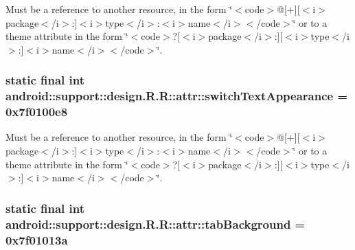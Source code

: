 Must be a reference to another resource, in the form \char`\"{}$<$code$>$@\mbox{[}+\mbox{]}\mbox{[}$<$i$>$package$<$/i$>$:\mbox{]}$<$i$>$type$<$/i$>$:$<$i$>$name$<$/i$>$$<$/code$>$\char`\"{} or to a theme attribute in the form \char`\"{}$<$code$>$?\mbox{[}$<$i$>$package$<$/i$>$:\mbox{]}\mbox{[}$<$i$>$type$<$/i$>$:\mbox{]}$<$i$>$name$<$/i$>$$<$/code$>$\char`\"{}. \hypertarget{classandroid_1_1support_1_1design_1_1_r_1_1attr_53ab231f10dcd9c22fe5b9d4ec790dcb}{
\subsubsection[{switchTextAppearance}]{\setlength{\rightskip}{0pt plus 5cm}static final int android::support::design.R.R::attr::switchTextAppearance = 0x7f0100e8}}
\label{classandroid_1_1support_1_1design_1_1_r_1_1attr_53ab231f10dcd9c22fe5b9d4ec790dcb}


Must be a reference to another resource, in the form \char`\"{}$<$code$>$@\mbox{[}+\mbox{]}\mbox{[}$<$i$>$package$<$/i$>$:\mbox{]}$<$i$>$type$<$/i$>$:$<$i$>$name$<$/i$>$$<$/code$>$\char`\"{} or to a theme attribute in the form \char`\"{}$<$code$>$?\mbox{[}$<$i$>$package$<$/i$>$:\mbox{]}\mbox{[}$<$i$>$type$<$/i$>$:\mbox{]}$<$i$>$name$<$/i$>$$<$/code$>$\char`\"{}. \hypertarget{classandroid_1_1support_1_1design_1_1_r_1_1attr_fc632f592cc8550a3f93c335f02c795b}{
\subsubsection[{tabBackground}]{\setlength{\rightskip}{0pt plus 5cm}static final int android::support::design.R.R::attr::tabBackground = 0x7f01013a}}
\label{classandroid_1_1support_1_1design_1_1_r_1_1attr_fc632f592cc8550a3f93c335f02c795b}


